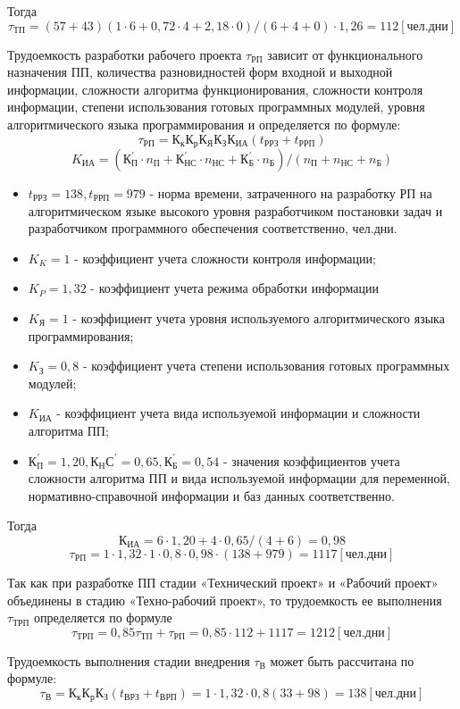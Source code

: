 Тогда
$$\tau_{ТП} = (57 + 43)(1 \cdot 6 + 0,72 \cdot 4 + 2,18 \cdot 0)/(6 + 4 + 0)
\cdot 1,26 = 112 [чел. дни]$$

Трудоемкость разработки рабочего проекта $\tau_{РП}$ зависит от функционального
назначения ПП, количества разновидностей форм входной и выходной информации,
сложности алгоритма функционирования, сложности контроля информации,
степени использования готовых программных модулей, уровня алгоритмического
языка программирования и определяется по формуле:
$$\tau_{РП} = К_{к} К_{р} К_{Я} К_{З} К_{ИА} (t_{РРЗ} + t_{РРП})$$
$$K_{ИА} = (К^{'}_{П} \cdot n_{П} + К^{'}_{НС} \cdot n_{НС} + К^{'}_{Б} \cdot
n_{Б})/(n_{П} + n_{НС} + n_{Б} )$$

\begin{itemize}
	\item $t_{РРЗ} = 138, t_{РРП} = 979$ - норма времени, затраченного на
		разработку РП на алгоритмическом языке высокого уровня разработчиком
		постановки задач и разработчиком программного обеспечения соответственно,
		чел.дни.
	\item $K_{K} = 1$ - коэффициент учета сложности контроля информации;
	\item $K_{P} = 1,32$ - коэффициент учета режима обработки информации
	\item $K_{Я} = 1$ - коэффициент учета уровня используемого
		алгоритмического языка программирования;
	\item $K_{З} = 0,8$ - коэффициент учета степени использования готовых
		программных модулей;
	\item $K_{ИА}$ - коэффициент учета вида используемой информации и
		сложности алгоритма ПП;
	\item $К^{'}_{П} = 1,20, К_{Н}С^{'} = 0,65, К^{'}_{Б} = 0,54$ -
		значения коэффициентов учета сложности алгоритма ПП и вида
		используемой информации для переменной, нормативно-справочной
		информации и баз данных соответственно.
\end{itemize}

Тогда
$$К_{ИА} = 6 \cdot 1,20 + 4 \cdot 0,65/(4 + 6) = 0,98$$
$$\tau_{РП} = 1 \cdot 1,32 \cdot 1 \cdot 0,8 \cdot 0,98 \cdot (138 + 979) = 1117 [чел. дни]$$

Так как при разработке ПП стадии «Технический проект» и «Рабочий
проект» объединены в стадию «Техно-рабочий проект», то трудоемкость ее
выполнения $\tau_{ТРП}$ определяется по формуле
$$\tau_{ТРП} = 0,85\tau_{ТП} + \tau_{РП} = 0,85 \cdot 112 + 1117 = 1212 [чел. дни]$$

Трудоемкость выполнения стадии внедрения $\tau_{В}$ может быть рассчитана
по формуле:
$$\tau_{В} = К_{к} К_{р} К_{З} (t_{ВРЗ} + t_{ВРП} ) = 1 \cdot 1,32 \cdot 0,8(33 + 98) = 138 [чел.дни]$$

